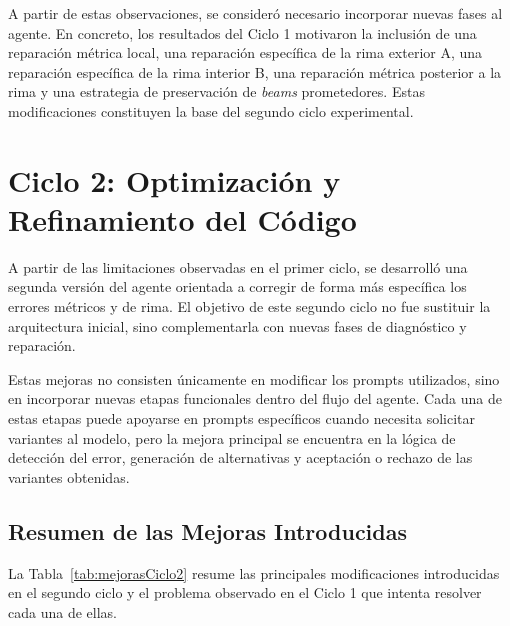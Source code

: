 \documentclass[12pt,a4paper,twoside,openright]{book}
\begin{document}
A partir de estas observaciones, se consideró necesario incorporar nuevas fases al agente. En concreto, los resultados del Ciclo 1 motivaron la inclusión de una reparación métrica local,
una reparación específica de la rima exterior A, una reparación específica de la rima interior B, una reparación métrica posterior a la rima y una estrategia de preservación de \emph{beams} prometedores.
Estas modificaciones constituyen la base del segundo ciclo experimental.


\section{Ciclo 2: Optimización y Refinamiento del Código}

A partir de las limitaciones observadas en el primer ciclo, se desarrolló una segunda versión del agente orientada a corregir de forma más específica los errores métricos y de rima.
El objetivo de este segundo ciclo no fue sustituir la arquitectura inicial, sino complementarla con nuevas fases de diagnóstico y reparación.

Estas mejoras no consisten únicamente en modificar los prompts utilizados, sino en incorporar nuevas etapas funcionales dentro del flujo del agente.
Cada una de estas etapas puede apoyarse en prompts específicos cuando necesita solicitar variantes al modelo, pero la mejora principal se encuentra en la lógica de detección del error, generación de alternativas y aceptación o rechazo de las variantes obtenidas.


\subsection{Resumen de las Mejoras Introducidas}

La Tabla~\ref{tab:mejorasCiclo2} resume las principales modificaciones introducidas en el segundo ciclo y el problema observado en el Ciclo 1 que intenta resolver cada una de ellas.
\end{document}
